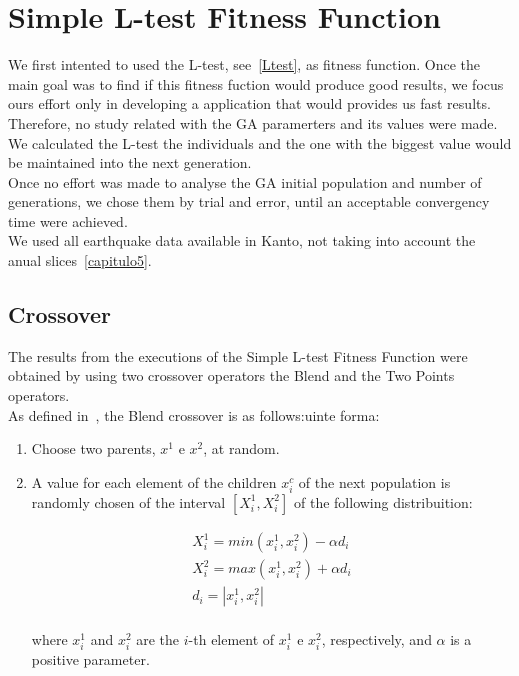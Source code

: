 \section{Simple L-test Fitness Function}
We first intented to used the L-test, see~\ref{Ltest}, as fitness function. Once the main goal was to find if this fitness fuction would produce good results, we focus ours effort only in developing a application that would provides us fast results. Therefore, no study related with the GA paramerters and its values were made. We calculated the L-test the individuals and the one with the biggest value would be maintained into the next generation.\\

Once no effort was made to analyse the GA initial population and number of generations, we chose them by trial and error, until an acceptable convergency time were achieved.\\

We used all earthquake data available in Kanto, not taking into account the anual slices~\ref{capitulo5}.\\

\subsection{Crossover}
The results from the executions of the Simple L-test Fitness Function were obtained by using two crossover operators the Blend and the Two Points operators.\\

As defined in~\cite{takahashi2001crossover}, the Blend crossover is as follows:uinte forma:

\begin{enumerate}
  \item Choose two parents, $x^1$ e $x^2$, at random.
  \item A value for each element of the children $x^c_i$ of the next population is randomly chosen of the interval $[X^1_i, X^2_i]$ of the following distribuition:
\begin{center}
	\begin{equation}
	\begin{split}
		X^1_i = min(x^1_i,x^2_i) - \alpha d_i		\\
		X^2_i = max(x^1_i,x^2_i) + \alpha d_i 		\\
d_i = |x^1_i,x^2_i| \\
	\end{split}
	\end{equation}
\end{center}
where $x^1_i$ and $x^2_i$ are the $i$-th element of $x^1_i$ e $x^2_i$, respectively, and $\alpha$ is a positive parameter.
\end{enumerate}

